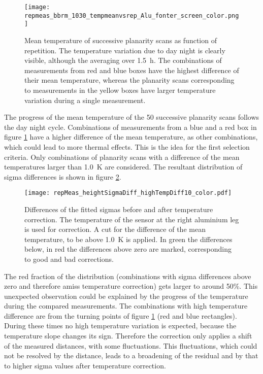 \documentclass[
a4paper,                                %
twoside,                                %
BCOR1.4cm,                      %
10pt,                           %
headings=normal,                %
headsepline,                    %
clearplainpage, %
final,                                  %
div=14,
parskip=full,
openright,
bibliography=toc
]{scrreprt}
\begin{document}
\begin{figure}[H]
	\centering
	\texttt{[image: repmeas\_bbrm\_1030\_tempmeanvsrep\_Alu\_fonter\_screen\_color.png]}
	\caption{Mean temperature of successive planarity scans as function of repetition. The temperature variation due to day night is clearly visible, although the averaging over \SI{1.5}{\hour}. The combinations of measurements from red and blue boxes have the highest difference of their mean temperature, whereas the planarity scans corresponding to measurements in the yellow boxes have larger temperature variation during a single measurement.}
	\label{repmeantemp}
\end{figure}

The progress of the mean temperature of the 50 successive planarity scans follows the day night cycle. Combinations of measurements from a blue and a red box in figure \ref{repmeantemp} have a higher difference of the mean temperature, as other combinations, which could lead to more thermal effects. This is the idea for the first selection criteria. Only combinations of planarity scans with a difference of the mean temperatures larger than \SI{1.0}{K} are considered. The resultant distribution of sigma differences is shown in figure \ref{largemeantempdiff}.

\begin{figure}[H]	
	\centering
	\texttt{[image: repMeas\_heightSigmaDiff\_highTempDiff10\_color.pdf]}
	\caption{Differences of the fitted sigmas before and after temperature correction. The temperature of the sensor at the right aluminium leg is used for correction. A cut for the difference of the mean temperature, to be above \SI{1.0}{K} is applied. 
	In green the differences below, in red the differences above zero are marked, corresponding to good and bad corrections.
	}
	\label{largemeantempdiff}
\end{figure}

The red fraction of the distribution (combinations with sigma differences above zero and therefore amiss temperature correction) gets larger to around 50\%. This unexpected observation could be explained by the progress of the temperature during the compared measurements. The combinations with high temperature difference are from the turning points of figure \ref{repmeantemp} (red and blue rectangles). During these times no high temperature variation is expected, because the temperature slope changes its sign. Therefore the correction only applies a shift of the measured distances, with some fluctuations. This fluctuations, which could not be resolved by the distance, leads to a broadening of the residual and by that to higher sigma values after temperature correction. 
\end{document}
